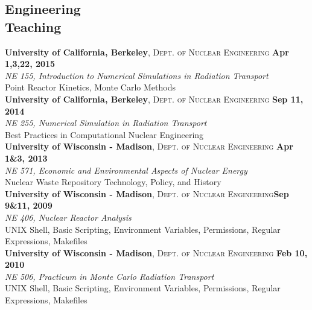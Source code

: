 \documentclass[margin,line]{resume}
\begin{document}
\begin{resume}
    \section{\mysidestyle Engineering\\Teaching}
    \textbf{University of California, Berkeley}, \textsc{Dept. of Nuclear Engineering} \hfill \textbf{Apr 1,3,22, 2015}\\
               \textsl{NE 155, Introduction to Numerical Simulations in Radiation Transport}\\
               Point Reactor Kinetics, Monte Carlo Methods 
               \vspace{2mm}\\
    \textbf{University of California, Berkeley}, \textsc{Dept. of Nuclear Engineering} \hfill \textbf{Sep 11, 2014}\\
               \textsl{NE 255, Numerical Simulation in Radiation Transport}\\
               Best Practices in Computational Nuclear Engineering
               \vspace{2mm}\\
    \textbf{University of Wisconsin - Madison}, \textsc{Dept. of Nuclear Engineering} \hfill \textbf{Apr 1\&3, 2013}\\
               \textsl{NE 571, Economic and Environmental Aspects of Nuclear Energy}\\
               Nuclear Waste Repository Technology, Policy, and History
               \vspace{2mm}\\
    \textbf{University of Wisconsin - Madison}, \textsc{Dept. of Nuclear Engineering}\hfill \textbf{Sep 9\&11, 2009}\\
               \textsl{NE 406, Nuclear Reactor Analysis}\\
               UNIX Shell, Basic Scripting, Environment Variables, Permissions, Regular Expressions, Makefiles
               \vspace{2mm}\\
    \textbf{University of Wisconsin - Madison}, \textsc{Dept. of Nuclear
    Engineering} \hfill \textbf{Feb 10, 2010}\\
               \textsl{NE 506, Practicum in Monte Carlo Radiation Transport}\\
               UNIX Shell, Basic Scripting, Environment Variables, Permissions, Regular Expressions, Makefiles
               \vspace{2mm}


\end{resume}
\end{document}
